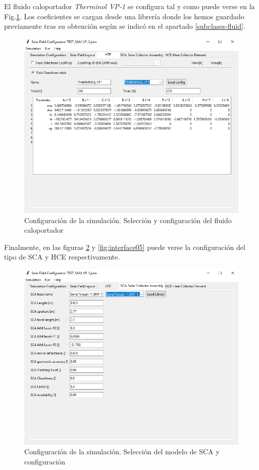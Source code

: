El fluido caloportador \emph{Therminol VP-1} se configura tal y como puede verse en la Fig.\ref{fig:interface03}. Los coeficientes se cargan desde una librería donde los hemos guardado previamente tras su obtención según se indicó en el apartado \ref{subclases-fluid}.

\begin{figure}[H]
\includegraphics[width=0.9\linewidth]{images/interface03.png}
\caption{Configuración de la simulación. Selección y configuración del fluido caloportador} 
\label{fig:interface03}
\end{figure}

Finalmente, en las figuras \ref{fig:interface04} y \ref{fig:interface05} puede verse la configuración del tipo de SCA y HCE respectivamente.

\begin{figure}[H]
\includegraphics[width=0.9\linewidth]{images/interface04.png}
\caption{Configuración de la simulación. Selección del modelo de SCA y configuración} 
\label{fig:interface04}
\end{figure}


